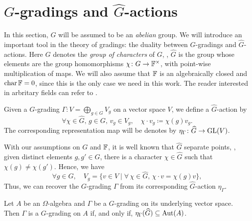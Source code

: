 \section{\texorpdfstring{$G$}{G}-gradings and \texorpdfstring{$\widehat{G}$}{G-hat}-actions}\label{sec:g-hat-action}

In this section, $G$ will be assumed to be an \emph{abelian} group. 
We will introduce an important tool in the theory of gradings: the duality between $G$-gradings and $\widehat G$-actions. 
Here $\widehat G$ denotes the \emph{group of characters} of $G$, \ie, $\widehat G$ is the group whose elements are the group homomorphisms $\chi\colon G \to \mathbb{F}^\times$, with point-wise multiplication of maps. 
We will also assume that $\mathbb{F}$ is an algebraically closed and $\operatorname{char} \mathbb{F} = 0$, since this is the only case we need in this work. 
The reader interested in arbritary fields can refer to \cite{livromicha}. 


\begin{defi}
    Given a $G$-grading $\Gamma : V = \bigoplus_{g\in G} V_g$ on a vector space $V$, we define a $\widehat G$-action by
    \[
        \forall \chi \in \widehat G, \, g\in G, \, v_g \in V_g, \quad \chi \cdot v_g \coloneqq \chi(g) v_g. 
    \]
    The corresponding representation map will be denotes by $\eta_\Gamma \colon \widehat G \to \operatorname{GL} (V)$. 
\end{defi}

With our assumptions on $G$ and $\mathbb{F}$, it is well known that $\widehat G$ separate points, \ie, given distinct elements $g, g'\in G$, there is a character $\chi \in \widehat G$ such that $\chi(g) \neq \chi(g')$. 
Hence, we have 
\[
    \forall g\in G, \quad V_g = \{ v\in V \mid \forall\, \chi \in \widehat G, \, \chi \cdot v = \chi(g)v \},
\]
Thus, we can recover the $G$-grading $\Gamma$ from its corresponding $\widehat G$-action $\eta_\Gamma$. 


\begin{prop}\label{prop:g-hat-Aut-A}
	Let $A$ be an $\Omega$-algebra and $\Gamma$ be a $G$-grading on its underlying vector space.
	Then $\Gamma$ is a $G$-grading on $A$ 
	if, and only if, $\eta_\Gamma(\widehat G) \subseteq \operatorname{Aut}(A)$.
\end{prop}

